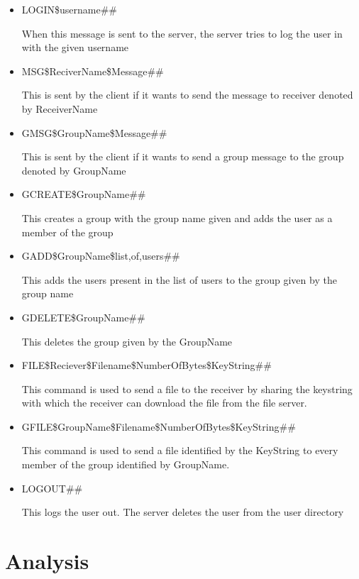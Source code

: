 \documentclass{article}
\begin{document}
\begin{itemize}
	\item LOGIN\$username\#\#

		When this message is sent to the server, the server tries to log the user in with the given username

	\item MSG\$ReciverName\$Message\#\#

		This is sent by the client if it wants to send the message to receiver denoted by ReceiverName
	\item GMSG\$GroupName\$Message\#\#

		This is sent by the client if it wants to send a group message to the group denoted by GroupName

	\item GCREATE\$GroupName\#\#

		This creates a group with the group name given and adds the user as a member of the group

	\item GADD\$GroupName\$list,of,users\#\#

		This adds the users present in the list of users to the group given by the group name

	\item GDELETE\$GroupName\#\#

		This deletes the group given by the GroupName

	\item FILE\$Reciever\$Filename\$NumberOfBytes\$KeyString\#\#

		This command is used to send a file to the receiver by sharing the keystring with which the receiver can download the file from the file server.

	\item GFILE\$GroupName\$Filename\$NumberOfBytes\$KeyString\#\#

		This command is used to send a file identified by the KeyString to every member of the group identified by GroupName.

	\item LOGOUT\#\#

		This logs the user out. The server deletes the user from the user directory

\end{itemize}

\section{Analysis}
\end{document}
